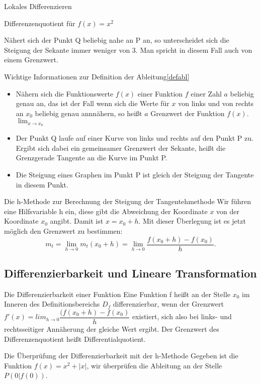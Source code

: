 \documentclass[a4paper]{report}
\begin{document}
\begin{section}{Lokales Differenzieren}
\begin{bsp*}{Differenzenquotient für $f(x) =x^2 $}
\end{bsp*}
Nähert sich der Punkt Q beliebig nahe an P an, so unterscheidet sich die Steigung der Sekante immer weniger von 3. Man spricht in diesem Fall auch von einem Grenzwert.\
\begin{merke*}{Wichtige Informationen zur Definition  der Ableitung}\ref{defabl}
\index{Ableitung!Definition}
\begin{itemize}
 \item Nähern sich die Funktionswerte $f(x)$ einer Funktion $f$ einer Zahl $a$ beliebig genau an, das ist der Fall wenn sich die Werte für $x$ von links und von rechts an $x_0$ beliebig genau annnähern, so heißt $a$ Grenzwert der Funktion $f(x)$. $\lim_{x \rightarrow x_0}$ 
 \item Der Punkt Q laufe auf einer Kurve von links und rechts auf den Punkt P zu. Ergibt sich dabei ein gemeinsamer Grenzwert der Sekante, heißt die Grenzgerade Tangente an die Kurve im Punkt P.
 \item Die Steigung eines Graphen im Punkt P ist gleich der Steigung der Tangente in diesem Punkt.
\end{itemize}
\end{merke*}
\begin{merke*}{Die h-Methode zur Berechnung der Steigung der Tangente}{hmethode}
Wir führen eine Hilfsvariable h ein, diese gibt die Abweichung der Koordinate $x$ von der Koordinate $x_0$ angibt. Damit ist $x=x_0 + h$. Mit dieser Überlegung ist es jetzt möglich den Grenzwert zu bestimmen: $$m_t =\lim_{h\rightarrow 0} m_t(x_0 +h) =\lim_{h\rightarrow 0} \dfrac{f(x_0 + h) - f(x_0)}{h}.$$
\end{merke*}
\subsection{Differenzierbarkeit und Lineare Transformation} 
\begin{defi}{Die Differenzierbarkeit einer Funktion}
 Eine Funktion f heißt an der Stelle $x_0$ im Inneren des Definitionsbereichs $D_f$ differenzierbar, wenn der Grenzwert $f'(x) =lim_{h\rightarrow 0}\dfrac{(f(x_0 +h) -f(x_0)}{h}$ existiert, sich also bei links- und rechtsseitiger Annäherung der gleiche Wert ergibt. Der Grenzwert des Differenzenquotient heißt Differentialquotient.
\end{defi}
\begin{bsp*}{Die Überprüfung der Differenzierbarkeit mit der h-Methode}
    Gegeben ist die Funktion $f(x)= x^2 + |x|$, wir überprüfen die Ableitung an der Stelle $P(0|f(0))$.


\end{bsp*}
\end{section}
\end{document}
